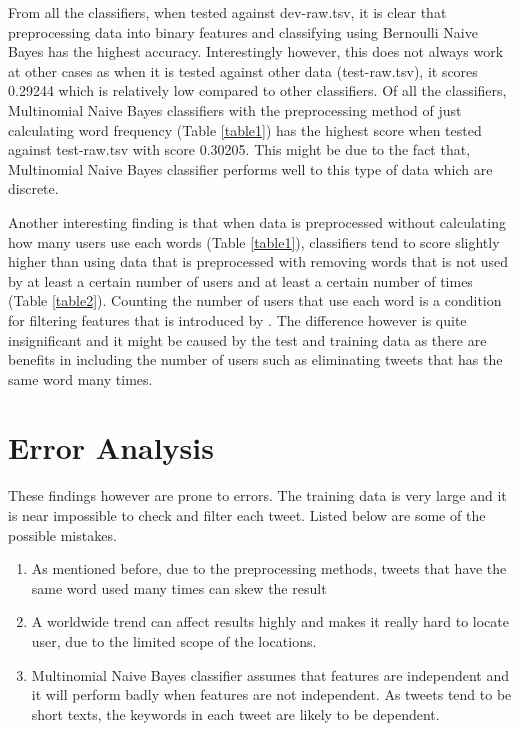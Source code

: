 \documentclass[11pt]{article}
\begin{document}
From all the classifiers, when tested against dev-raw.tsv, it is clear that
preprocessing data into binary features and classifying using Bernoulli Naive
Bayes has the highest accuracy. Interestingly however, this does not always work at
other cases as when it is tested against other data (test-raw.tsv), it scores 0.29244
which is relatively low compared to other classifiers. Of all the classifiers,
Multinomial Naive Bayes classifiers with the preprocessing method of just
calculating word frequency (Table \ref{table1}) has the highest score when tested against test-raw.tsv with score
0.30205.
This might be due to the fact that, Multinomial Naive Bayes classifier performs
well to this type of data which are discrete.

\noindent\newline
Another interesting finding is that when data is preprocessed without
calculating how many users use each words (Table \ref{table1}), classifiers tend to score slightly
higher than using data that is preprocessed with removing words that is not used
by at least a certain number of users and at least a certain number of times
(Table \ref{table2}). 
Counting the number of users that use
each word is a condition for filtering features that is introduced by . The
difference however is quite insignificant and it might be caused by the 
test and training data as there are benefits in including the number of users
such as eliminating tweets that has the same word many times.

\section{Error Analysis}

These findings however are prone to errors. The training data is very large and
it is near impossible to check and filter each tweet. Listed below are some
of the possible mistakes.
\begin{enumerate}
  \item As mentioned before, due to the preprocessing methods, tweets that have
  the same word used many times can skew the result
  \item A worldwide trend can affect results highly and makes it really hard to
  locate user, due to the limited scope of the locations.
  \item Multinomial Naive Bayes classifier assumes that features are independent and it
  will perform badly when features are not independent. As tweets tend to be
  short texts, the keywords in each tweet are likely to be dependent.
\end{enumerate}
\end{document}
